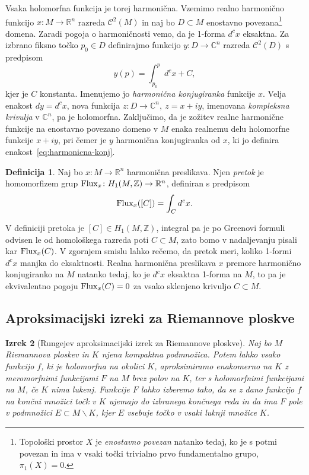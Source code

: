 \documentclass[12pt,a4paper,twoside]{article}
\theoremstyle{definition} %
\newtheorem{definicija}{Definicija}[section]
\theoremstyle{plain} %
\newtheorem{izrek}[definicija]{Izrek}
\numberwithin{equation}{section}  %
\newcommand{\R}{\mathbb R}
\newcommand{\Z}{\mathbb Z}
\begin{document}
Vsaka holomorfna funkcija je torej harmonična. 
Vzemimo realno harmonično funkcijo $x \colon M \to \mathbb{R}^{n}$ razreda $\mathcal{C}^2(M)$ in naj bo $D \subset M$ enostavno povezana\footnote{Topološki prostor $X$ je \emph{enostavno povezan} natanko tedaj, ko je s potmi povezan in ima v vsaki točki trivialno prvo fundamentalno grupo, $\pi_{1}(X)=0$.} domena. Zaradi pogoja o harmoničnosti vemo, da je 1-forma $d^{c}x$ eksaktna. Za izbrano fiksno točko $p_{0} \in D$ definirajmo funkcijo $y \colon D \to \mathbb{C}^{n}$ razreda $\mathcal{C}^2(D)$ s predpisom
\begin{equation} \label{eq:harmonicna-konj}
y(p) = \int_{p_0}^{p} d^{c}x + C,
\end{equation}
kjer je $C$ konstanta. Imenujemo jo \emph{harmonična konjugiranka} funkcije $x$. Velja enakost $dy = d^{c}x$, nova funkcija $z \colon D \to \mathbb{C}^{n}, \ z = x+iy$, imenovana \emph{kompleksna krivulja} v $\mathbb{C}^{n}$, pa je holomorfna. Zaključimo, da je zožitev realne harmonične funkcije na enostavno povezano domeno v $M$ enaka realnemu delu holomorfne funkcije $x+iy$, pri čemer je $y$ harmonična konjugiranka od $x$, ki jo definira enakost~\eqref{eq:harmonicna-konj}.

\begin{definicija}
Naj bo $x \colon M \to \R^{n}$ harmonična preslikava. Njen \emph{pretok} je homomorfizem grup $\textup{Flux}_{x} \colon H_{1} (M, \Z) \to \R^{n}$, definiran s predpisom 
\begin{equation} \label{eq:pretok}
\textup{Flux}_{x} ([C]) = \int_{C} {d^{c} x}.
\end{equation}
\end{definicija}
%
V definiciji pretoka je $[C] \in H_{1} (M, \Z)$, integral pa je po Greenovi formuli odvisen le od homološkega razreda poti $C \subset M$, zato bomo v nadaljevanju pisali kar $\textup{Flux}_{x} (C)$. V zgornjem smislu lahko rečemo, da pretok meri, koliko 1-formi $d^{c}x$ manjka do eksaktnosti. Realna harmonična preslikava $x$ premore harmonično konjugiranko na $M$ natanko tedaj, ko je $d^{c}x$ eksaktna 1-forma na $M$, to pa je ekvivalentno pogoju $\textup{Flux}_{x}(C)=0$ za vsako sklenjeno krivuljo $C \subset M$.

\subsection{Aproksimacijski izreki za Riemannove ploskve}
%
\begin{izrek} [Rungejev aproksimacijski izrek za Riemannove ploskve]
Naj bo $M$ Riemannova ploskev in $K$ njena kompaktna podmnožica. 
Potem lahko vsako funkcijo $f$, ki je holomorfna na okolici $K$, aproksimiramo enakomerno na $K$ z meromorfnimi funkcijami $F$ na $M$ brez polov na $K$, ter s holomorfnimi funkcijami na $M$, če $K$ nima lukenj.
Funkcije $F$ lahko izberemo tako, da se z dano funkcijo $f$ na končni množici točk v $K$ ujemajo do izbranega končnega reda in da ima $F$ pole v podmnožici $E \subset M \backslash K$, kjer $E$ vsebuje točko v vsaki luknji množice $K$. 
\end{izrek}
\end{document}
